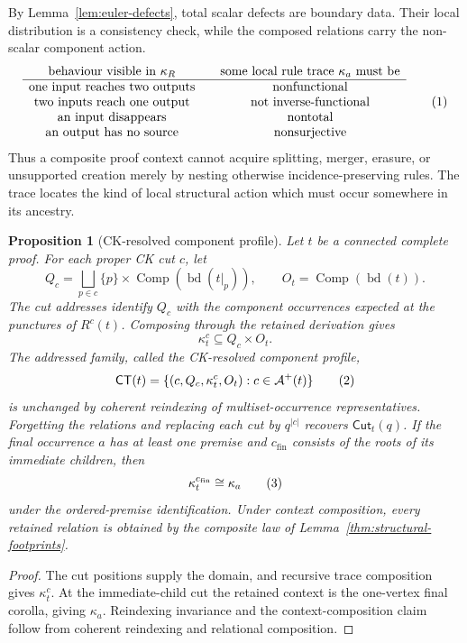 \documentclass[10pt,a4paper]{article}
\theoremstyle{plain}
\newtheorem{proposition}[theorem]{Proposition}
\theoremstyle{definition}
\theoremstyle{remark}
\newcommand{\rootseq}{\operatorname{bd}}
\newcommand{\Comp}{\operatorname{Comp}}
\newcommand{\eqtag}{\refstepcounter{equation}\tag{\theequation}}
\begin{document}
By Lemma~\ref{lem:euler-defects}, total scalar defects are boundary data.
Their local distribution is a consistency check, while the composed
relations carry the non-scalar component action.
\[
\begin{array}{c@{\qquad}c}
\text{behaviour visible in }\kappa_R
&
\text{some local rule trace }\kappa_a\text{ must be}\\
\hline
\text{one input reaches two outputs} & \text{nonfunctional}\\
\text{two inputs reach one output} & \text{not inverse-functional}\\
\text{an input disappears} & \text{nontotal}\\
\text{an output has no source} & \text{nonsurjective}
\end{array}
\eqtag\label{eq:component-trace-payoff}
\]
Thus a composite proof context cannot acquire splitting, merger, erasure,
or unsupported creation merely by nesting otherwise incidence-preserving
rules.  The trace locates the kind of local structural action which must
occur somewhere in its ancestry.

\begin{proposition}[CK-resolved component profile]
\label{prop:ck-component-profile}
Let \(t\) be a connected complete proof.  For each proper CK cut \(c\),
let
\[
 Q_c=\bigsqcup_{p\in c}\{p\}\times
       \Comp(\rootseq(t|_p)),
 \qquad O_t=\Comp(\rootseq(t)).
\]
The cut addresses identify \(Q_c\) with the component occurrences expected
at the punctures of \(R^c(t)\).  Composing through the retained derivation
gives
\[
                  \kappa_t^c\subseteq Q_c\times O_t .
\]
The addressed family, called the \emph{CK-resolved component profile},
\[
 \mathsf{CT}(t)
   =\{(c,Q_c,\kappa_t^c,O_t):c\in\mathcal A^+(t)\}
\eqtag\label{eq:ck-component-profile}
\]
is unchanged by coherent reindexing of multiset-occurrence
representatives.  Forgetting the relations and
replacing each cut by \(q^{|c|}\) recovers
\(\mathsf{Cut}_t(q)\).  If the final occurrence \(a\) has at least one premise and
\(c_{\mathrm{fin}}\) consists of the roots of its immediate children, then
\[
                  \kappa_t^{c_{\mathrm{fin}}}\cong\kappa_a
\eqtag\label{eq:transport-final-corolla}
\]
under the ordered-premise identification.  Under context composition,
every retained relation is obtained by the composite law of
Lemma~\ref{thm:structural-footprints}.
\end{proposition}

\begin{proof}
The cut positions supply the domain, and recursive trace composition gives
\(\kappa_t^c\).  At the immediate-child cut the retained context is
the one-vertex final corolla, giving \(\kappa_a\).  Reindexing invariance
and the context-composition claim follow from coherent reindexing and
relational composition.
\end{proof}
\end{document}

